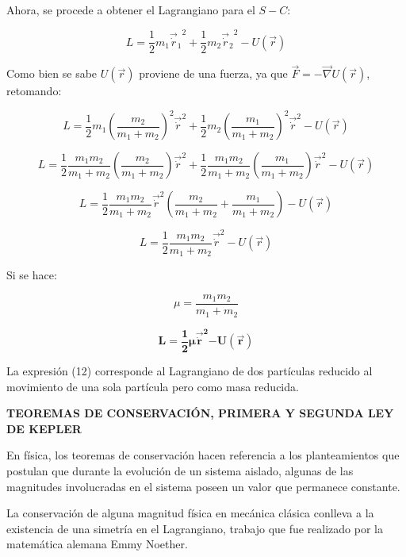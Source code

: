 \documentclass[]{article}
\begin{document}
Ahora, se procede a obtener el Lagrangiano para el \(S - C\):

\[L = \frac{1}{2}m_{1}{{\overrightarrow{\dot{r}}}_{1}}^{2} + \frac{1}{2}m_{2}{{\overrightarrow{\dot{r}}}_{2}}^{2} - U\left( \overrightarrow{r} \right)\]

Como bien se sabe \(U(\overrightarrow{r})\) proviene de una fuerza, ya
que
\(\overrightarrow{F} = - \overrightarrow{\nabla}U\left( \overrightarrow{r} \right)\),
retomando:

\[L = \frac{1}{2}m_{1}\left( \frac{m_{2}}{m_{1} + m_{2}} \right)^{2}{\overrightarrow{\dot{r}}}^{2} + \frac{1}{2}m_{2}\left( \frac{m_{1}}{m_{1} + m_{2}} \right)^{2}{\overrightarrow{\dot{r}}}^{2} - U\left( \overrightarrow{r} \right)\]

\[L = \frac{1}{2}\frac{m_{1}m_{2}}{m_{1} + m_{2}}\left( \frac{m_{2}}{m_{1} + m_{2}} \right){\overrightarrow{\dot{r}}}^{2} + \frac{1}{2}\frac{m_{1}m_{2}}{m_{1} + m_{2}}\left( \frac{m_{1}}{m_{1} + m_{2}} \right){\overrightarrow{\dot{r}}}^{2} - U\left( \overrightarrow{r} \right)\]

\[L = \frac{1}{2}\frac{m_{1}m_{2}}{m_{1} + m_{2}}{\overrightarrow{\dot{r}}}^{2}\left( \frac{m_{2}}{m_{1} + m_{2}} + \frac{m_{1}}{m_{1} + m_{2}} \right) - U\left( \overrightarrow{r} \right)\]

\[L = \frac{1}{2}\frac{m_{1}m_{2}}{m_{1} + m_{2}}{\overrightarrow{\dot{r}}}^{2} - U\left( \overrightarrow{r} \right)\]

Si se hace:

\[\mu = \frac{m_{1}m_{2}}{m_{1} + m_{2}}
\]

\[\mathbf{L =}\frac{\mathbf{1}}{\mathbf{2}}\mathbf{\mu}{\overrightarrow{\dot{\mathbf{r}}}}^{\mathbf{2}}\mathbf{- U}\left( \overrightarrow{\mathbf{r}} \right)\]

La expresión (12) corresponde al Lagrangiano de dos partículas reducido
al movimiento de una sola partícula pero como masa reducida.

\textbf{TEOREMAS DE CONSERVACIÓN, PRIMERA Y SEGUNDA LEY DE KEPLER}

En física, los teoremas de conservación hacen referencia a los
planteamientos que postulan que durante la evolución de un sistema
aislado, algunas de las magnitudes involucradas en el sistema poseen un
valor que permanece constante.

La conservación de alguna magnitud física en mecánica clásica conlleva a
la existencia de una simetría en el Lagrangiano, trabajo que fue
realizado por la matemática alemana Emmy Noether.
\end{document}
